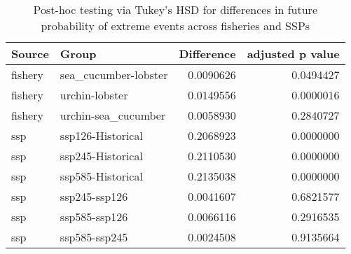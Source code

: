 \begin{table}

\caption{\label{tab:future_extreme_mhw_hsd}Post-hoc testing via Tukey’s HSD for differences in future probability of extreme events across fisheries and SSPs}
\centering
\begin{tabular}[t]{llrr}
\toprule
Source & Group & Difference & adjusted p value\\
\midrule
fishery & sea\_cucumber-lobster & 0.0090626 & 0.0494427\\
fishery & urchin-lobster & 0.0149556 & 0.0000016\\
fishery & urchin-sea\_cucumber & 0.0058930 & 0.2840727\\
ssp & ssp126-Historical & 0.2068923 & 0.0000000\\
ssp & ssp245-Historical & 0.2110530 & 0.0000000\\
\addlinespace
ssp & ssp585-Historical & 0.2135038 & 0.0000000\\
ssp & ssp245-ssp126 & 0.0041607 & 0.6821577\\
ssp & ssp585-ssp126 & 0.0066116 & 0.2916535\\
ssp & ssp585-ssp245 & 0.0024508 & 0.9135664\\
\bottomrule
\end{tabular}
\end{table}